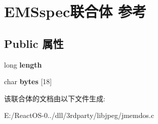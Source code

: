 \hypertarget{union_e_m_sspec}{}\section{E\+M\+Sspec联合体 参考}
\label{union_e_m_sspec}
\subsection*{Public 属性}
\begin{DoxyCompactItemize}
\item 
\mbox{\label{union_e_m_sspec_a1517bb518ee6f43cbe194e51ffefe4b9}} 
long {\bfseries length}
\item 
\mbox{\label{union_e_m_sspec_a69e61660d94ef2e7b6363e9b26b2b675}} 
char {\bfseries bytes} \mbox{[}18\mbox{]}
\end{DoxyCompactItemize}


该联合体的文档由以下文件生成\+:\begin{DoxyCompactItemize}
\item 
E\+:/\+React\+O\+S-\/0../dll/3rdparty/libjpeg/jmemdos.\+c\end{DoxyCompactItemize}
